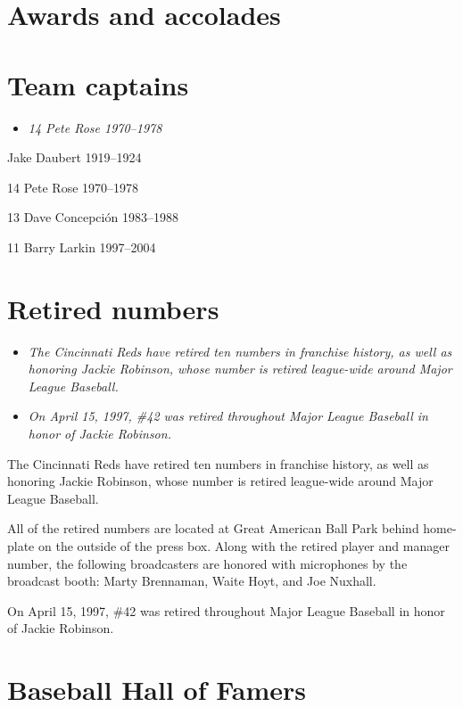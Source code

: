 \section{Awards and accolades}\label{awards-and-accolades}

\section{Team captains}\label{team-captains}

\begin{itemize}
\item
  \emph{14 Pete Rose 1970--1978}
\end{itemize}

Jake Daubert 1919--1924

14 Pete Rose 1970--1978

13 Dave Concepción 1983--1988

11 Barry Larkin 1997--2004

\section{Retired numbers}\label{retired-numbers}

\begin{itemize}
\item
  \emph{The Cincinnati Reds have retired ten numbers in franchise
  history, as well as honoring Jackie Robinson, whose number is retired
  league-wide around Major League Baseball.}
\item
  \emph{On April 15, 1997, \#42 was retired throughout Major League
  Baseball in honor of Jackie Robinson.}
\end{itemize}

The Cincinnati Reds have retired ten numbers in franchise history, as
well as honoring Jackie Robinson, whose number is retired league-wide
around Major League Baseball.

All of the retired numbers are located at Great American Ball Park
behind home-plate on the outside of the press box. Along with the
retired player and manager number, the following broadcasters are
honored with microphones by the broadcast booth: Marty Brennaman, Waite
Hoyt, and Joe Nuxhall.

On April 15, 1997, \#42 was retired throughout Major League Baseball in
honor of Jackie Robinson.

\section{Baseball Hall of Famers}\label{baseball-hall-of-famers}


